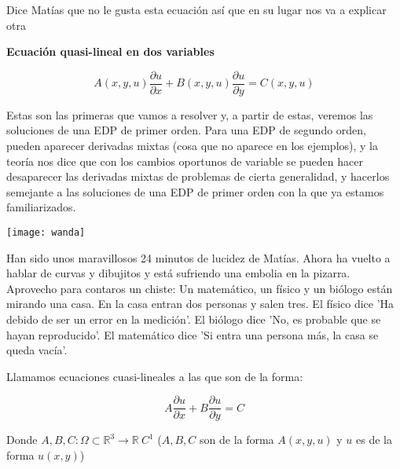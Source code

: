 \documentclass[openany]{book}
\begin{document}
Dice Matías que no le gusta esta ecuación así que en su lugar nos va a explicar otra

\begin{definition}
  { \color{turquoise} \textbf{Ecuación quasi-lineal en dos variables}}

  $$ A(x,y,u) \dfrac{\partial u}{\partial x}+B(x,y,u)\dfrac{\partial u}{\partial y}=C(x,y,u) $$
\end{definition}

Estas son las primeras que vamos a resolver y, a partir de estas, veremos las soluciones de una EDP de primer orden. Para una EDP de segundo orden, pueden aparecer derivadas mixtas (cosa que no aparece en los ejemplos), y la teoría nos dice que con los cambios oportunos de variable se pueden hacer desaparecer las derivadas mixtas de problemas de cierta generalidad, y hacerlos semejante a las soluciones de una EDP de primer orden con la que ya estamos familiarizados.

\vspace{1cm}

\begin{minipage}[l]{0.1\textwidth}
    \texttt{[image: wanda]}
\end{minipage}
\begin{minipage}[l]{0.8\textwidth}
  Han sido unos maravillosos 24 minutos de lucidez de Matías. Ahora ha vuelto a hablar de curvas y dibujitos y está sufriendo una embolia en la pizarra. Aprovecho para contaros un chiste: Un matemático, un físico y un biólogo están mirando una casa. En la casa entran dos personas y salen tres. El físico dice 'Ha debido de ser un error en la medición'. El biólogo dice 'No, es probable que se hayan reproducido'. El matemático dice 'Si entra una persona más, la casa se queda vacía'.
\end{minipage}

\vspace{1cm}

\begin{definition}
  Llamamos ecuaciones cuasi-lineales a las que son de la forma:

  $$ A \dfrac{\partial u}{\partial x} + B \dfrac{\partial u}{\partial y} = C $$

  Donde $ A,B,C: \Omega \subset \mathbb{R}^3 \to \mathbb{R}\ C ^{1} $ ($ A,B,C $ son de la forma $ A(x,y,u) $ y $ u $ es de la forma $ u(x,y) $)

\end{definition}
\end{document}
